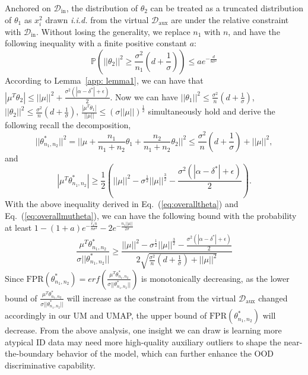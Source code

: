 \documentclass{article}
\theoremstyle{plain}
\theoremstyle{definition}
\theoremstyle{remark}
\begin{document}
Anchored on $\mathcal{D}_\text{in}$, the distribution of $\theta_2$ can be treated as a truncated distribution of $\theta_1$ as $x_i^2$ drawn \textit{i.i.d.} from the virtual $\mathcal{D}_\text{aux}$ are under the relative constraint with $\mathcal{D}_\text{in}$. Without losing the generality, we replace $n_1$ with $n$, and have the following inequality with a finite positive constant $a$:
\begin{equation}
\label{eq:concentration2}
    \mathbb{P}(||\theta_2||^2\geq\frac{\sigma^2}{n_1}(d+\frac{1}{\sigma}))\leq ae^{-\frac{d}{8\sigma^2}}
\end{equation}
According to Lemma~\ref{app: lemma1}, we can have that $|\mu^T\theta_2|\leq||\mu||^2+\frac{\sigma^2(|\alpha-\delta^*|+\epsilon)}{2}$. Now we can have $||\theta_1||^2\leq\frac{\sigma^2}{n}(d+\frac{1}{\sigma})$, $||\theta_2||^2\leq\frac{\sigma^2}{n}(d+\frac{1}{\sigma})$, $\frac{|\mu^T\theta_1|}{||\mu||}\leq(\sigma||\mu||)^{\frac{1}{2}}$ simultaneously hold and derive the following recall the decomposition,
\begin{equation}
\label{eq:overalltheta}
    ||\theta^*_{n_1,n_2}||^2 = ||\mu+\frac{n_1}{n_1+n_2}\theta_1+\frac{n_2}{n_1+n_2}\theta_2||^2 \leq \frac{\sigma^2}{n}(d+\frac{1}{\sigma}) + ||\mu||^2,
\end{equation}
and
\begin{equation}
\label{eq:overallmutheta}
    |\mu^T\theta^*_{n_1,n_2}|\geq\frac{1}{2}(||\mu||^2-\sigma^{\frac{1}{2}}||\mu||^{\frac{3}{2}}-\frac{\sigma^2(|\alpha-\delta^*|+\epsilon)}{2}).
\end{equation}
With the above inequality derived in Eq.~(\ref{eq:overalltheta}) and Eq.~(\ref{eq:overallmutheta}), we can have the following bound with the probability at least $1-(1+a)e^{-\frac{r_1n}{8\sigma^2}}-2e^{-\frac{n_1||\mu||}{2\sigma}}$
\begin{equation}
    \frac{\mu^T\theta^*_{n_1,n_2}}{\sigma||\theta^*_{n_1,n_2}||} \geq \frac{||\mu||^2-\sigma^{\frac{1}{2}}||\mu||^{\frac{3}{2}}-\frac{\sigma^2(|\alpha-\delta^*|+\epsilon)}{2}}{2\sqrt{\frac{\sigma^2}{n}(d+\frac{1}{\sigma}) + ||\mu||^2}}
\end{equation}
Since $\text{FPR}(\theta^*_{n_1,n_2})=erf(\frac{\mu^T\theta^*_{n_1,n_2}}{\sigma||\theta^*_{n_1,n_2}||})$ is monotonically decreasing, as the lower bound of $\frac{\mu^T\theta^*_{n_1,n_2}}{\sigma||\theta^*_{n_1,n_2}||}$ will increase as the constraint from the virtual $\mathcal{D}_\text{aux}$ changed accordingly in our UM and UMAP, the upper bound of $\text{FPR}(\theta^*_{n_1,n_2})$ will decrease.
From the above analysis, one insight we can draw is learning more atypical ID data may need more high-quality auxiliary outliers to shape the near-the-boundary behavior of the model, which can further enhance the OOD discriminative capability.
\end{document}

